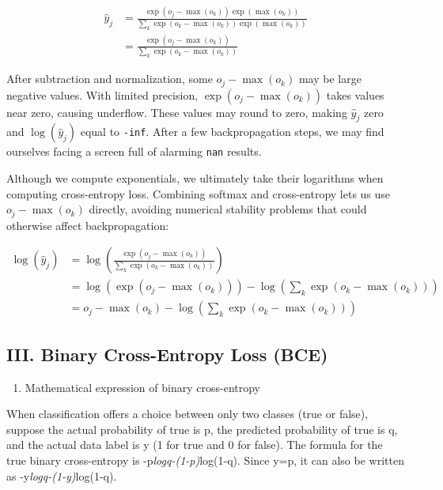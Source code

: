 \[
\begin{aligned}
\hat{y}_j
&=\frac{\exp(o_j-\max(o_k))\exp(\max(o_k))}
{\sum_k\exp(o_k-\max(o_k))\exp(\max(o_k))}\\
&=\frac{\exp(o_j-\max(o_k))}
{\sum_k\exp(o_k-\max(o_k))}
\end{aligned}
\]

After subtraction and normalization, some \(o_j-\max(o_k)\) may be large negative values. With limited precision, \(\exp(o_j-\max(o_k))\) takes values near zero, causing underflow. These values may round to zero, making \(\hat{y}_j\) zero and \(\log(\hat{y}_j)\) equal to \texttt{-inf}. After a few backpropagation steps, we may find ourselves facing a screen full of alarming \texttt{nan} results.

Although we compute exponentials, we ultimately take their logarithms when computing cross-entropy loss. Combining softmax and cross-entropy lets us use \(o_j-\max(o_k)\) directly, avoiding numerical stability problems that could otherwise affect backpropagation:

\[
\begin{aligned}
\log(\hat{y}_j)
&=\log\left(\frac{\exp(o_j-\max(o_k))}
{\sum_k\exp(o_k-\max(o_k))}\right)\\
&=\log(\exp(o_j-\max(o_k)))
-\log\left(\sum_k\exp(o_k-\max(o_k))\right)\\
&=o_j-\max(o_k)-\log\left(\sum_k\exp(o_k-\max(o_k))\right)
\end{aligned}
\]

\hypertarget{iii.-binary-cross-entropy-loss-bce}{%
\subsection{III. Binary Cross-Entropy Loss (BCE)}\label{iii.-binary-cross-entropy-loss-bce}}

\begin{enumerate}
\def\labelenumi{\arabic{enumi}.}
\tightlist
\item
  Mathematical expression of binary cross-entropy
\end{enumerate}

When classification offers a choice between only two classes (true or false), suppose the actual probability of true is p, the predicted probability of true is q, and the actual data label is y (1 for true and 0 for false). The formula for the true binary cross-entropy is -p\emph{logq-(1-p)}log(1-q). Since y=p, it can also be written as -y\emph{logq-(1-y)}log(1-q).

